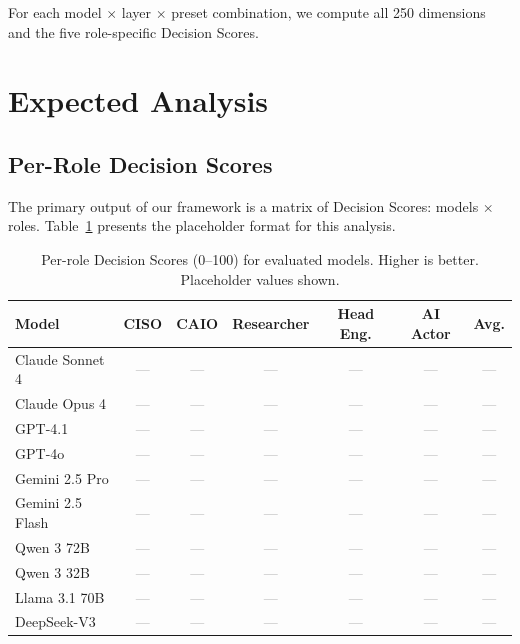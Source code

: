 \documentclass[10pt,twocolumn]{article}
\newcommand{\placeholder}{\textcolor{gray}{\textsf{---}}}
\begin{document}
For each model $\times$ layer $\times$ preset combination, we compute all 250 dimensions and the five role-specific Decision Scores.

\section{Expected Analysis}
\label{sec:analysis}

\subsection{Per-Role Decision Scores}
\label{sec:per_role}

The primary output of our framework is a matrix of Decision Scores: models $\times$ roles. Table~\ref{tab:decision_scores} presents the placeholder format for this analysis.

\begin{table}[t]
\centering
\caption{Per-role Decision Scores (0--100) for evaluated models. Higher is better. Placeholder values shown.}
\label{tab:decision_scores}
\small
\begin{tabular}{@{}l c c c c c c@{}}
\toprule
\textbf{Model} & \textbf{CISO} & \textbf{CAIO} & \textbf{Researcher} & \textbf{Head Eng.} & \textbf{AI Actor} & \textbf{Avg.} \\
\midrule
Claude Sonnet 4          & \placeholder & \placeholder & \placeholder & \placeholder & \placeholder & \placeholder \\
Claude Opus 4            & \placeholder & \placeholder & \placeholder & \placeholder & \placeholder & \placeholder \\
GPT-4.1                  & \placeholder & \placeholder & \placeholder & \placeholder & \placeholder & \placeholder \\
GPT-4o                   & \placeholder & \placeholder & \placeholder & \placeholder & \placeholder & \placeholder \\
Gemini 2.5 Pro           & \placeholder & \placeholder & \placeholder & \placeholder & \placeholder & \placeholder \\
Gemini 2.5 Flash         & \placeholder & \placeholder & \placeholder & \placeholder & \placeholder & \placeholder \\
Qwen 3 72B               & \placeholder & \placeholder & \placeholder & \placeholder & \placeholder & \placeholder \\
Qwen 3 32B               & \placeholder & \placeholder & \placeholder & \placeholder & \placeholder & \placeholder \\
Llama 3.1 70B            & \placeholder & \placeholder & \placeholder & \placeholder & \placeholder & \placeholder \\
DeepSeek-V3              & \placeholder & \placeholder & \placeholder & \placeholder & \placeholder & \placeholder \\
\bottomrule
\end{tabular}
\end{table}
\end{document}
